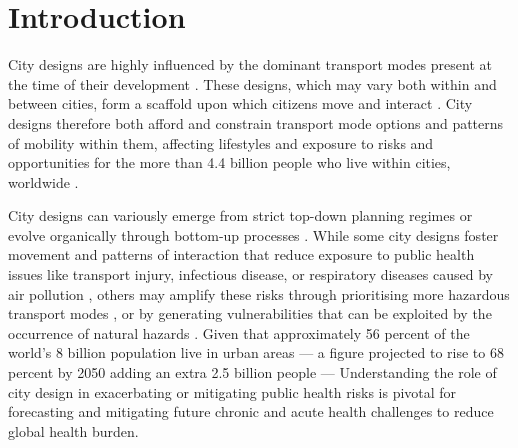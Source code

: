 \documentclass[preprint,12pt]{elsarticle}
\begin{document}
\begin{frontmatter}








\end{frontmatter}



\section*{Introduction}

City designs are highly influenced by the dominant transport modes present at the time of their development \cite{KNOWLES2020102607}. These designs, which may vary both within and between cities, form a scaffold upon which citizens move and interact \cite{Thompson2020}. City designs therefore both afford and constrain transport mode options and patterns of mobility within them, affecting lifestyles and exposure to risks and opportunities for the more than 4.4 billion people who live within cities, worldwide \cite{WHO2023}.

City designs can variously emerge from strict top-down planning regimes \cite{mundigo1977city} or evolve organically through bottom-up processes \cite{batty2017thinking}. While some city designs foster movement and patterns of interaction that reduce exposure to public health issues like transport injury, infectious disease, or respiratory diseases caused by air pollution \cite{Wijnands2022, Stevenson2016}, others may amplify these risks through prioritising more hazardous transport modes \cite{Thompson2020}, or by generating vulnerabilities that can be exploited by the occurrence of natural hazards \cite{wang2023flood, stanley2022managing}. Given that approximately 56 percent of the world's 8 billion population live in urban areas — a figure projected to rise to 68 percent by 2050 adding an extra 2.5 billion people \cite{WHO2023} — Understanding the role of city design in exacerbating or mitigating public health risks is pivotal for forecasting and mitigating future chronic and acute health challenges to reduce global health burden.
\end{document}
